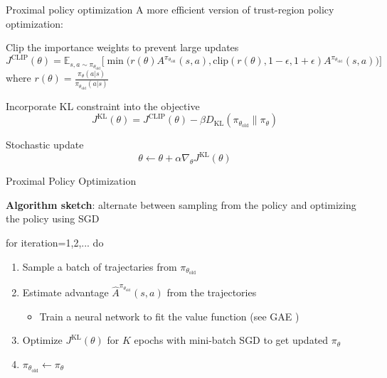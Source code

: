 \documentclass[usenames,dvipsnames,notes,11pt,aspectratio=169,hyperref={colorlinks=true, linkcolor=blue}]{beamer}
\begin{document}
\begin{frame}
    {Proximal policy optimization}
    A more efficient version of trust-region policy optimization:
    \begin{wideitemize}[<+->]
        \item Clip the importance weights to prevent large updates
            \[
J^{\text{CLIP}}(\theta) = \mathbb{E}_{s, a \sim \pi_{\theta_{\text{old}}}} \Big[ \min \Big( r(\theta) A^{\pi_{\theta_{\text{old}}}}(s,a), \text{clip}(r(\theta), 1 - \epsilon, 1 + \epsilon) A^{\pi_{\theta_{\text{old}}}}(s,a) \Big) \Big]
\]
            where $r(\theta) = \frac{\pi_{\theta}(a|s)}{\pi_{\theta_{\text{old}}}(a|s)}$
        \item Incorporate KL constraint into the objective
            \[
            J^{\text{KL}}(\theta) = J^{\text{CLIP}}(\theta) - \beta D_{\text{KL}}(\pi_{\theta_{\text{old}}} \| \pi_{\theta})
            \]
        \item Stochastic update
            \[
            \theta \leftarrow \theta + \alpha \nabla_{\theta} J^{\text{KL}}(\theta)
            \]
    \end{wideitemize}
\end{frame}

\begin{frame}
    {Proximal Policy Optimization}

    {\bf Algorithm sketch}: alternate between sampling from the policy and optimizing the policy using SGD

            for iteration=1,2,... do\\
            \begin{enumerate}[<+->]
                \item Sample a batch of trajectaries from $\pi_{\theta_\text{old}}$
                \item Estimate advantage $\hat{A}^{\pi_{\theta_\text{old}}}(s,a)$ from the trajectories
                    \begin{itemize}
                        \item Train a neural network to fit the value function (see GAE ) 
                    \end{itemize}
                \item Optimize $J^{\text{KL}}(\theta)$ for $K$ epochs with mini-batch SGD to get updated $\pi_\theta$
                \item $\pi_{\theta_\text{old}} \leftarrow \pi_\theta$
            \end{enumerate}
\end{frame}
\end{document}
